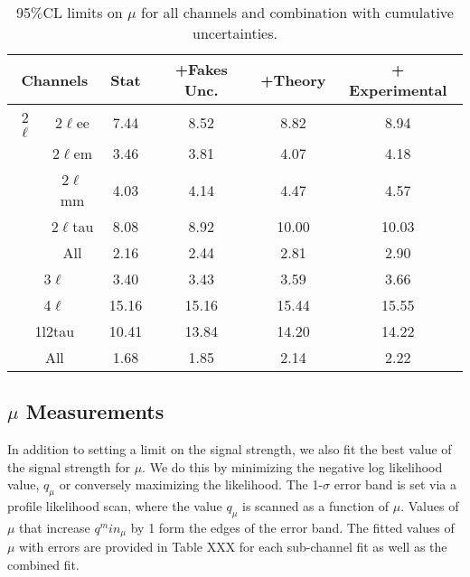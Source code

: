 \begin{table}[htbp]
\begin{center}
\begin{tabular}{|c|c|c|c|c|c|}
\hline 
\multicolumn{2}{|c|}{ Channels} &  Stat &  +Fakes Unc.  & +Theory  & + Experimental\\ 
\hline 
2$\ell$       & 2$\ell$ee  & 7.44 & 8.52 & 8.82 &8.94 \\ 
         & 2$\ell$em   &3.46 & 3.81 & 4.07 &4.18 \\ 
        & 2$\ell$mm   & 4.03 & 4.14 & 4.47 &4.57 \\ 
        & 2$\ell$tau   &8.08 & 8.92 & 10.00 &10.03 \\ 
        &  All   & 2.16 & 2.44 & 2.81 &2.90 \\ 
\hline 
\multicolumn{2}{|c|}{ 3$\ell$ }  &3.40 & 3.43 & 3.59 &3.66 \\ 
\hline 
\multicolumn{2}{|c|}{ 4$\ell$ }  & 15.16 & 15.16 & 15.44 &15.55 \\ 
\hline 
\multicolumn{2}{|c|}{ 1l2tau }  & 10.41 & 13.84 & 14.20 &14.22 \\ 
\hline 
\multicolumn{2}{|c|}{ All } & 1.68 & 1.85 & 2.14 &2.22 \\ 
\hline 
\end{tabular} 
\caption{\label{table:results_cumulative} 95$\%$CL limits on $\mu$ for all channels and combination with cumulative uncertainties.}
\end{center} 
\end{table} 



\subsection{$\mu$ Measurements}

In addition to setting a limit on the signal strength, we also fit the best value of the signal strength for $\mu$. We do this by minimizing the negative log likelihood value, $q_{\mu}$ or conversely maximizing the likelihood. The 1-$\sigma$ error band is set via a profile likelihood scan, where the value $q_{\mu}$ is scanned as a function of $\mu$. Values of $\mu$ that increase $q^min_{\mu}$ by 1 form the edges of the error band. The fitted values of $\mu$ with errors are provided in Table XXX for each sub-channel fit as well as the combined fit. 

